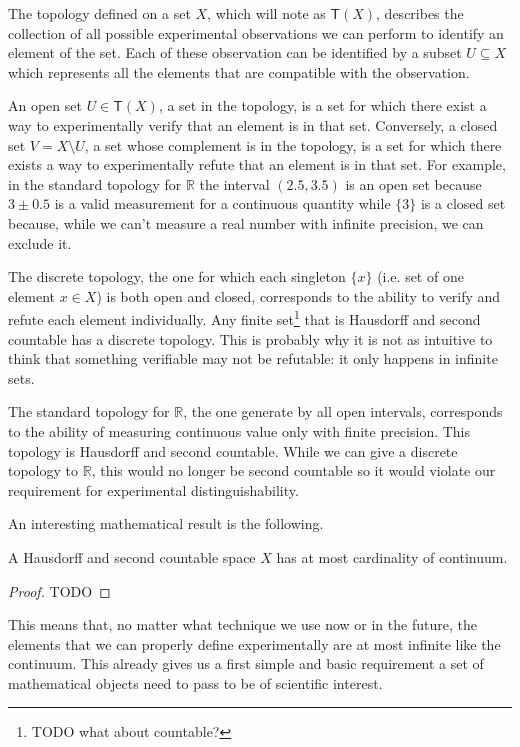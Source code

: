 \documentclass[11pt,letterpaper,fleqn]{memoir} %
\begin{document}
The topology defined on a set $X$, which will note as $\mathsf{T}(X)$, describes the collection of all possible experimental observations we can perform to identify an element of the set. Each of these observation can be identified by a subset $U \subseteq X$ which represents all the elements that are compatible with the observation.

An open set $U \in \mathsf{T}(X)$, a set in the topology, is a set for which there exist a way to  experimentally verify that an element is in that set. Conversely, a closed set $V = X \setminus U $, a set whose complement is in the topology, is a set for which there exists a way to experimentally refute that an element is in that set. For example, in the standard topology for $\mathbb{R}$ the interval $(2.5, 3.5)$ is an open set because $3 \pm 0.5$ is a valid measurement for a continuous quantity while $\{3\}$ is a closed set because, while we can't measure a real number with infinite precision, we can exclude it.

The discrete topology, the one for which each singleton $\{x\}$ (i.e. set of one element $x \in X$) is both open and closed, corresponds to the ability to verify and refute each element individually. Any finite set\footnote{TODO what about countable?} that is Hausdorff and second countable has a discrete topology. This is probably why it is not as intuitive to think that something verifiable may not be refutable: it only happens in infinite sets.

The standard topology for $\mathbb{R}$, the one generate by all open intervals, corresponds to the ability of measuring continuous value only with finite precision. This topology is Hausdorff and second countable. While we can give a discrete topology to $\mathbb{R}$, this would no longer be second countable so it would violate our requirement for experimental distinguishability.

An interesting mathematical result is the following.

\begin{prop}
	A Hausdorff and second countable space $X$ has at most cardinality of continuum.
\end{prop}

\begin{proof}
	TODO
\end{proof}

This means that, no matter what technique we use now or in the future, the elements that we can properly define experimentally are at most infinite like the continuum. This already gives us a first simple and basic requirement a set of mathematical objects need to pass to be of scientific interest.
\end{document}
